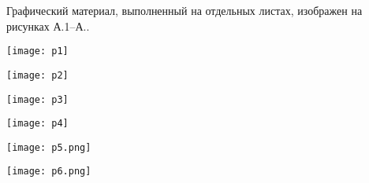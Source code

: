 
Графический материал, выполненный на отдельных листах,
изображен на рисунках А.1--А..
\setcounter{числоПлакатов}{0}

\renewcommand{\thefigure}{А.\arabic{figure}} %

\begin{landscape}

\begin{плакат}
    \texttt{[image: p1]}
    \label{pl1:image}      
\end{плакат}

\begin{плакат}
    \texttt{[image: p2]}
    \label{pl2:image}      
\end{плакат}

\begin{плакат}
    \texttt{[image: p3]}
    \label{pl3:image}      
\end{плакат}

\begin{плакат}
    \texttt{[image: p4]}
    \label{pl4:image}      
\end{плакат}

\begin{плакат}
    \texttt{[image: p5.png]}
    \label{pl5:image}      
\end{плакат}

\begin{плакат}
    \texttt{[image: p6.png]}
    \label{pl6:image}      
\end{плакат}

\end{landscape}
